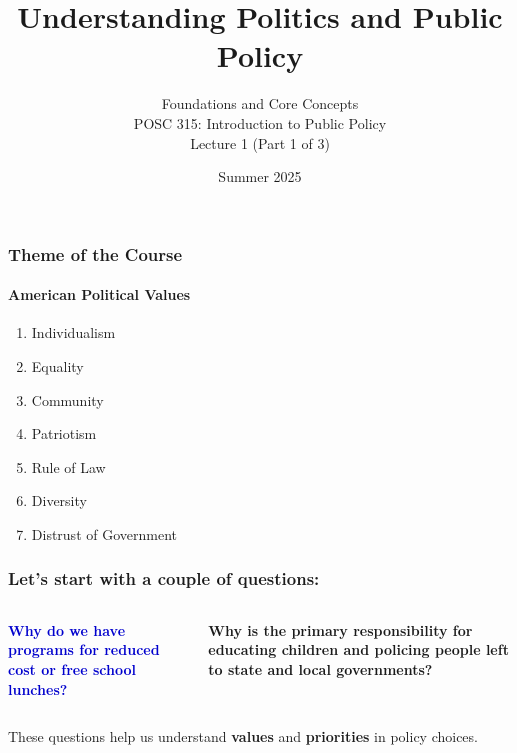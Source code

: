 \documentclass[10pt]{beamer}
\begin{document}
\title{Understanding Politics and Public Policy}
\subtitle{Foundations and Core Concepts\\POSC 315: Introduction to Public Policy\\Lecture 1 (Part 1 of 3)}
\date{Summer 2025}

\maketitle

\begin{frame}
\frametitle{Theme of the Course}
\framesubtitle{American Political Values}

\begin{block}{}
\begin{enumerate}
\item Individualism
\item Equality
\item Community
\item Patriotism
\item Rule of Law
\item Diversity
\item Distrust of Government
\end{enumerate}
\end{block}

\end{frame}

\begin{frame}
\frametitle{Let's start with a couple of questions:}

\begin{columns}
\begin{column}{0.48\textwidth}
\begin{block}{}
\centering
\textcolor{mediumblue}{\textbf{Why do we have programs for reduced cost or free school lunches?}}
\end{block}
\end{column}

\begin{column}{0.48\textwidth}
\begin{block}{}
\centering
\textcolor{titanblue}{\textbf{Why is the primary responsibility for educating children and policing people left to state and local governments?}}
\end{block}
\end{column}
\end{columns}

\vspace{1cm}
\pause
\centering
These questions help us understand \textbf{values} and \textbf{priorities} in policy choices.

\end{frame}
\end{document}

